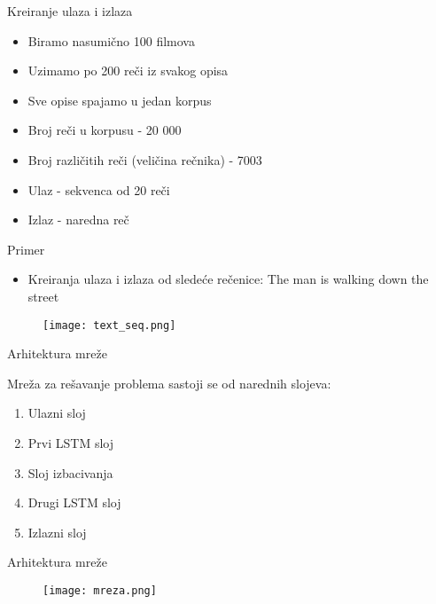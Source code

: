 \documentclass[table]{beamer}
\begin{document}
\begin{frame}{Kreiranje ulaza i izlaza}
\begin{itemize}
    \item Biramo nasumično {\color{blue}100} filmova
    \item Uzimamo po {\color{blue}200} reči iz svakog opisa
    \item Sve opise spajamo u jedan \alert{korpus}
    \item Broj reči u korpusu - {\color{blue} 20 000}
    \item Broj različitih reči (veličina rečnika) - {\color{blue} 7003}
    \item Ulaz - sekvenca od {\color{blue} 20} reči
    \item Izlaz - naredna reč
\end{itemize}
    
\end{frame}

\begin{frame}{Primer}

\begin{itemize}
    \item Kreiranja ulaza i izlaza od sledeće rečenice: The man is walking down the street
\end{itemize}
\begin{figure}
    \centering
    \texttt{[image: text\_seq.png]}
\end{figure}
\end{frame}

\begin{frame}{Arhitektura mreže}

Mreža za rešavanje problema sastoji se od narednih slojeva:
\begin{enumerate}
    \item Ulazni sloj 
    \item Prvi LSTM sloj
    \item Sloj izbacivanja 
    \item Drugi LSTM sloj
    \item Izlazni sloj
\end{enumerate}
    
\end{frame}

\begin{frame}{Arhitektura mreže}
\begin{figure}
    \centering
    \texttt{[image: mreza.png]}
\end{figure}
    
\end{frame}
\end{document}
